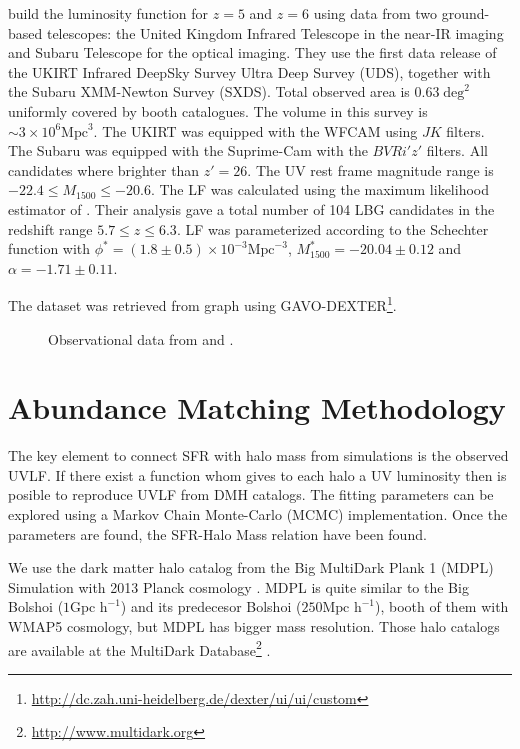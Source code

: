 \documentclass{emulateapj}
\begin{document}
\citet{mclure09} build the luminosity function for $z=5$ and $z=6$ using data from two ground-based
 telescopes: the United Kingdom Infrared Telescope in the near-IR imaging and Subaru 
 Telescope for the optical imaging. They use the first data release of the UKIRT Infrared 
 DeepSky Survey Ultra Deep Survey (UDS), together with the Subaru XMM-Newton 
 Survey (SXDS). Total observed area is $0.63 \deg^2$ uniformly covered by booth catalogues.
The volume in this survey is $\sim 3 \times 10^6 \textrm{Mpc}^3$.
The UKIRT was equipped with the WFCAM using $J K$ filters. The Subaru was equipped 
with the Suprime-Cam with the $B V R i' z'$ filters. All candidates where brighter than 
$z'=26$. The UV rest frame magnitude range is $-22.4\leq M_{1500} \leq-20.6$. The LF 
was calculated using the maximum likelihood estimator of \citet{schmidt68}. 
Their analysis gave a total number of 104 LBG candidates in the redshift range 
$5.7\leq z \leq 6.3$. LF was parameterized according to the Schechter function with 
$\phi^*  =(1.8 \pm 0.5) \times 10 ^{-3}  \textrm{Mpc}^{-3}$, $M^*_{1500} = -20.04\pm 0.12$ 
and $\alpha = -1.71 \pm 0.11$. 

The dataset was retrieved from \cite{mclure09} graph using
GAVO-DEXTER\footnote{\url{http://dc.zah.uni-heidelberg.de/dexter/ui/ui/custom}}.




\begin{figure}
\caption{Observational data from \cite{bouwens14,mclure09}and \cite{willott13}.}
\label{graph_observational_data}
\end{figure}


\section{Abundance Matching Methodology}
\label{sec:methodology}

The key element to connect SFR with halo mass from simulations is the observed UVLF. 
If there exist a function whom gives to each halo a UV luminosity then is posible to 
reproduce UVLF from DMH catalogs. The fitting parameters can be explored using a 
Markov Chain Monte-Carlo (MCMC) implementation. Once the parameters are found, 
the SFR-Halo Mass relation have been found.

We use the dark matter halo catalog from the Big MultiDark Plank 1 (MDPL) Simulation 
\citep{klypin14} with 2013 Planck cosmology \citep{planck1}. MDPL is quite similar to the 
Big Bolshoi ($1 \textrm{Gpc h}^{-1}$) \citep{prada12} and 
its predecesor Bolshoi \citep{klypin11} ($250 \textrm{Mpc h}^{-1}$), booth of them with 
WMAP5 cosmology, but MDPL has bigger mass resolution.  Those halo catalogs are 
available at the MultiDark Database\footnote{\url{http://www.multidark.org}} 
\citep{riebe13}.
\end{document}
